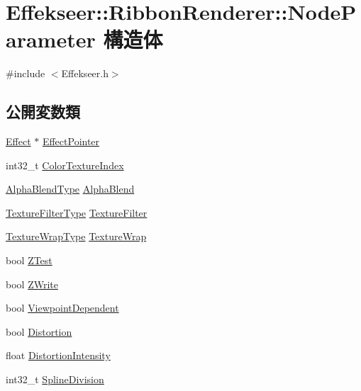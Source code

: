 \hypertarget{struct_effekseer_1_1_ribbon_renderer_1_1_node_parameter}{}\section{Effekseer\+:\+:Ribbon\+Renderer\+:\+:Node\+Parameter 構造体}
\label{struct_effekseer_1_1_ribbon_renderer_1_1_node_parameter}


{\ttfamily \#include $<$Effekseer.\+h$>$}

\subsection*{公開変数類}
\begin{DoxyCompactItemize}
\item 
\mbox{\hyperlink{class_effekseer_1_1_effect}{Effect}} $\ast$ \mbox{\hyperlink{struct_effekseer_1_1_ribbon_renderer_1_1_node_parameter_a733a9a94d376e7f26a3e85c189e18462}{Effect\+Pointer}}
\item 
int32\+\_\+t \mbox{\hyperlink{struct_effekseer_1_1_ribbon_renderer_1_1_node_parameter_a8fa40641d813533bfb6aec0d607406f2}{Color\+Texture\+Index}}
\item 
\mbox{\hyperlink{namespace_effekseer_a8c32fd5b7ec7feed73314b2ae8086949}{Alpha\+Blend\+Type}} \mbox{\hyperlink{struct_effekseer_1_1_ribbon_renderer_1_1_node_parameter_a7053fb40618f6bef7fc452a8de786959}{Alpha\+Blend}}
\item 
\mbox{\hyperlink{namespace_effekseer_ae3518502cfcb4ec4991f13c0b3e4c6ee}{Texture\+Filter\+Type}} \mbox{\hyperlink{struct_effekseer_1_1_ribbon_renderer_1_1_node_parameter_a6ed4ddc1ed71e38e017ef9ecab0b7056}{Texture\+Filter}}
\item 
\mbox{\hyperlink{namespace_effekseer_a5320c83784602974b6278bf1a77b58a3}{Texture\+Wrap\+Type}} \mbox{\hyperlink{struct_effekseer_1_1_ribbon_renderer_1_1_node_parameter_a29af7046bb166f238f41c85567bf8f66}{Texture\+Wrap}}
\item 
bool \mbox{\hyperlink{struct_effekseer_1_1_ribbon_renderer_1_1_node_parameter_afc1ba37c217130a7c6f35878f9c05fda}{Z\+Test}}
\item 
bool \mbox{\hyperlink{struct_effekseer_1_1_ribbon_renderer_1_1_node_parameter_ae19aa5b5a49a8c15136e38e4bbf1c090}{Z\+Write}}
\item 
bool \mbox{\hyperlink{struct_effekseer_1_1_ribbon_renderer_1_1_node_parameter_a64155eb858a6f7a2d0068d57ab66285e}{Viewpoint\+Dependent}}
\item 
bool \mbox{\hyperlink{struct_effekseer_1_1_ribbon_renderer_1_1_node_parameter_ae5971cdf8b9f415d536b9e920efdd219}{Distortion}}
\item 
float \mbox{\hyperlink{struct_effekseer_1_1_ribbon_renderer_1_1_node_parameter_a50d814383382197d16d213abf3341297}{Distortion\+Intensity}}
\item 
int32\+\_\+t \mbox{\hyperlink{struct_effekseer_1_1_ribbon_renderer_1_1_node_parameter_a355cb6a1d554d9beae5cdad3835475fd}{Spline\+Division}}
\end{DoxyCompactItemize}



